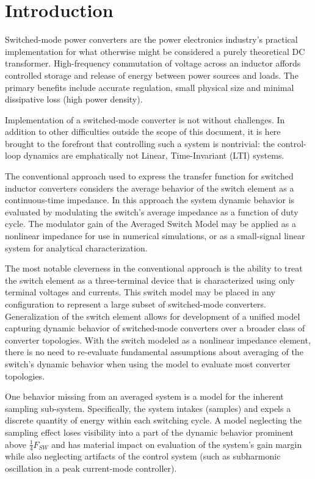 \documentclass[conference]{IEEEtran}
\begin{document}
\section{Introduction}
Switched-mode power converters are the power electronics industry's practical implementation for what otherwise might be considered a purely theoretical DC transformer. High-frequency commutation of voltage across an inductor affords controlled storage and release of energy between power sources and loads.  The primary benefits include accurate regulation, small physical size and minimal dissipative loss (high power density). 

Implementation of a switched-mode converter is not without challenges. In addition to other difficulties outside the scope of this document, it is here brought to the forefront that controlling such a system is nontrivial: the control-loop dynamics are emphatically not Linear, Time-Invariant (LTI) systems.

The conventional approach used to express the transfer function for switched inductor converters considers the average behavior of the switch element as a continuous-time impedance.  In this approach the system dynamic behavior is evaluated by modulating the switch's average impedance as a function of duty cycle. The modulator gain of the Averaged Switch Model may be applied as a nonlinear impedance for use in numerical simulations, or as a small-signal linear system for analytical characterization.

The most notable cleverness in the conventional approach is the ability to treat the switch element as a three-terminal device that is characterized using only terminal voltages and currents. This switch model may be placed in any configuration to represent a large subset of switched-mode converters.  Generalization of the switch element allows for development of a unified model capturing dynamic behavior of switched-mode converters over a broader class of converter topologies. With the switch modeled as a nonlinear impedance element, there is no need to re-evaluate fundamental assumptions about averaging of the switch's dynamic behavior when using the model to evaluate most converter topologies.

One behavior missing from an averaged system is a model for the inherent sampling sub-system. Specifically, the system intakes (samples) and expels a discrete quantity of energy within each switching cycle.  A model neglecting the sampling effect loses visibility into a part of the dynamic behavior prominent above $\frac{1}{4} F_{SW}$ and has material impact on evaluation of the system's gain margin while also neglecting artifacts of the control system (such as subharmonic oscillation in a peak current-mode controller). 
\end{document}
